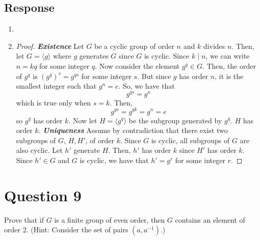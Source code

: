 \documentclass[13pt]{article}
\begin{document}
\subsection*{Response}
\begin{enumerate}[label=(\alph*)]
    \item 
    \item 
        \begin{proof}
            \textit{\textbf{Existence}}
            \newline
            Let $G$ be a cyclic group of order $n$ and $k$ divides $n$. Then, 
            let $G = \langle g \rangle$ where $g$ generates $G$ since $G$ is cyclic.
            Since $k \mid n$, we can write $n = kq$ for some integer $q$. Now consider 
            the element $g^q \in G$. Then, the order of $g^q$ is 
            $\left(g^q\right)^s = g^{qs}$ for some integer $s$. But since $g$ has order $n$,
            it is the smallest integer such that $g^n = e$. So, we have that
            \[g^{qs} = g^n\]
            which is true only when $s = k$. Then,
            \[g^{qs} = g^{qk} = g^n = e\]
            so $g^q$ has order $k$. Now let $H = \langle g^q \rangle$ be the subgroup
            generated by $g^q$. $H$ has order $k$.
            \newline
            \newline
            \textit{\textbf{Uniqueness}}
            \newline
            Assume by contradiction that there exist two subgroups of $G$, $H, H'$, 
            of order $k$. Since $G$ is cyclic, all subgroups of $G$ are also cyclic.
            Let $h'$ generate $H$. Then, $h'$ has order $k$ since $H'$ has order $k$.
            Since $h' \in G$ and $G$ is cyclic, we have that $h' = g^r$ for some
            integer $r$.         
        \end{proof}
\end{enumerate}





\newpage
\section*{Question 9}
Prove that if $G$ is a finite group of even order, then $G$ contains an element of order 2. (Hint:
Consider the set of pairs $(a, a^{-1})$.)
\end{document}
